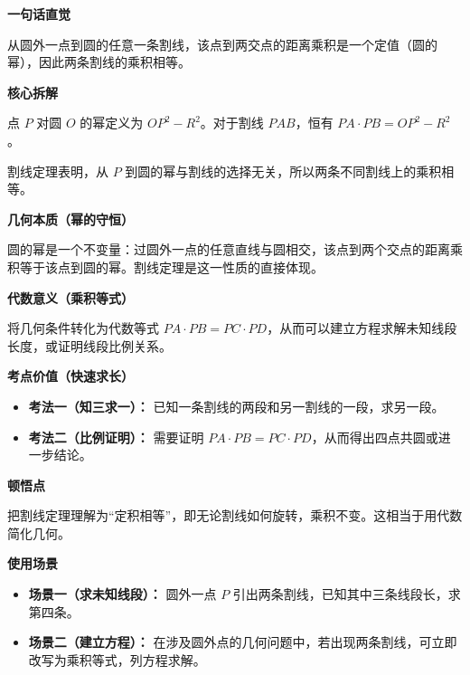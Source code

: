 \begin{explanationbox}
	\textbf{\textcolor{CExplanation}{一句话直觉}}

	从圆外一点到圆的任意一条割线，该点到两交点的距离乘积是一个定值（圆的幂），因此两条割线的乘积相等。

	\medskip
	\textbf{\textcolor{CExplanation}{核心拆解}}
	\begin{description}[style=nextline, leftmargin=2.8em, labelsep=0.5em, itemsep=0.45em]
		\item[\textbf{要点一（圆幂概念）：}] 点 $P$ 对圆 $O$ 的幂定义为 $OP^2 - R^2$。对于割线 $PAB$，恒有 $PA \cdot PB = OP^2 - R^2$。
		\item[\textbf{要点二（定理统一）：}] 割线定理表明，从 $P$ 到圆的幂与割线的选择无关，所以两条不同割线上的乘积相等。
	\end{description}

	\medskip
	\textbf{\textcolor{CExplanation}{几何本质（幂的守恒）}}

	圆的幂是一个不变量：过圆外一点的任意直线与圆相交，该点到两个交点的距离乘积等于该点到圆的幂。割线定理是这一性质的直接体现。

	\medskip
	\textbf{\textcolor{CExplanation}{代数意义（乘积等式）}}

	将几何条件转化为代数等式 $PA \cdot PB = PC \cdot PD$，从而可以建立方程求解未知线段长度，或证明线段比例关系。

	\medskip
	\textbf{\textcolor{CExplanation}{考点价值（快速求长）}}
	\begin{itemize}[leftmargin=*, itemsep=0.5em, topsep=0.4em]
		\item \textbf{考法一（知三求一）：} 已知一条割线的两段和另一割线的一段，求另一段。
		\item \textbf{考法二（比例证明）：} 需要证明 $PA \cdot PB = PC \cdot PD$，从而得出四点共圆或进一步结论。
	\end{itemize}

	\medskip
	\textbf{\textcolor{CExplanation}{顿悟点}}

	把割线定理理解为“定积相等”，即无论割线如何旋转，乘积不变。这相当于用代数简化几何。

	\medskip
	\textbf{\textcolor{CExplanation}{使用场景}}
	\begin{itemize}[leftmargin=*, itemsep=0.5em, topsep=0.4em]
		\item \textbf{场景一（求未知线段）：} 圆外一点 $P$ 引出两条割线，已知其中三条线段长，求第四条。
		\item \textbf{场景二（建立方程）：} 在涉及圆外点的几何问题中，若出现两条割线，可立即改写为乘积等式，列方程求解。
	\end{itemize}
\end{explanationbox}
